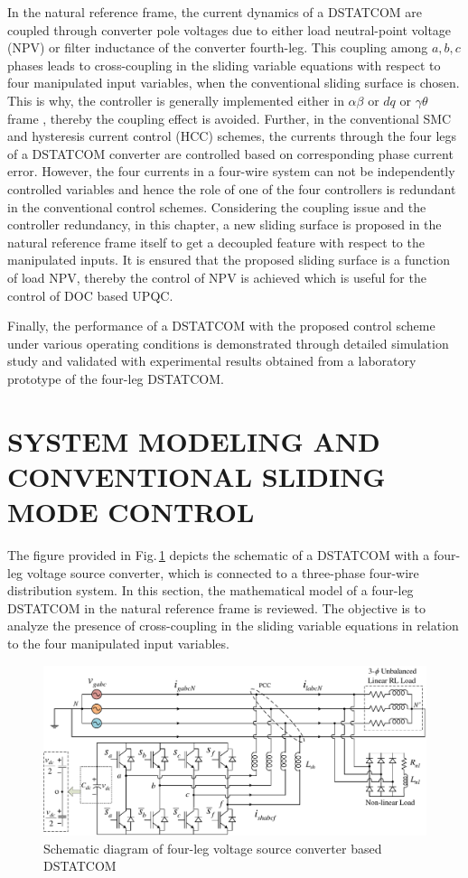 In the natural reference frame, the current dynamics of a DSTATCOM are coupled through converter pole voltages due to either load neutral-point voltage (NPV) or filter inductance of the converter fourth-leg. This coupling among $a, b, c$ phases leads to cross-coupling in the sliding variable equations with respect to four manipulated input variables, when the conventional sliding surface is chosen. This is why, the controller is generally implemented either in $\alpha\beta$ or $dq$ or $\gamma\theta$ frame \cite{9108551,8616892,8264745}, thereby the coupling effect is avoided. Further, in the conventional SMC and hysteresis current control (HCC) schemes, the currents through the four legs of a DSTATCOM converter are controlled based on corresponding phase current error. However, the four currents in a four-wire system can not be independently controlled variables and hence the role of one of the four controllers is redundant in the conventional control schemes. Considering the coupling issue and the controller redundancy, in this chapter, a new sliding surface is proposed in the natural reference frame itself to get a decoupled feature with respect to the manipulated inputs. It is ensured that the proposed sliding surface is a function of load NPV, thereby the control of NPV is achieved which is useful for the control of DOC based UPQC. 

Finally, the performance of a DSTATCOM with the proposed control scheme under various operating conditions is demonstrated through detailed simulation study and validated with experimental results obtained from a laboratory prototype of the four-leg DSTATCOM.
\vspace*{-1cm}
\section{SYSTEM MODELING AND CONVENTIONAL SLIDING MODE CONTROL}
\noindent The figure provided in Fig.\,\ref{fig4.1} depicts the schematic of a DSTATCOM with a four-leg voltage source converter, which is connected to a three-phase four-wire distribution system. In this section, the mathematical model of a four-leg DSTATCOM in the natural reference frame is reviewed. The objective is to analyze the presence of cross-coupling in the sliding variable equations in relation to the four manipulated input variables.
\begin{figure}[h]\centering
	\includegraphics[scale=0.7]{figures/Chapter_4/Mine/4leg_DSTATCOM.pdf}
	\caption{Schematic diagram of four-leg voltage source converter based DSTATCOM} 
	\label{fig4.1}
\end{figure}\vspace*{-1cm} 

